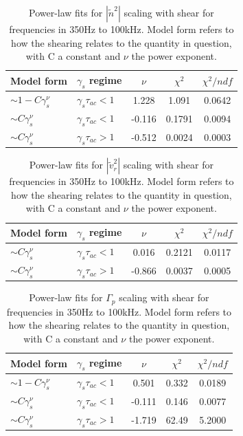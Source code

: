 \documentclass[aip,pop,amsmath,amssymb,reprint,superscriptaddress]{revtex4-1} %
\begin{document}
\begin{table}
\caption{\label{tab:table1}Power-law fits for $|\tilde{n}^{2}|$ scaling with shear for frequencies in 350Hz to 100kHz. Model form refers to how the shearing relates to the quantity in question, with C a constant and $\nu$ the power exponent.}
\begin{ruledtabular}
\begin{tabular}{llccc}
Model form&$\gamma_{s}$ regime&$\nu$&$\chi^2$&$\chi^2/ndf$\\
\hline
$\sim 1-C\gamma_{s}^\nu$&$\gamma_{s}\tau_{ac}<1$&1.228&1.091&0.0642\\
$\sim C\gamma_{s}^\nu$&$\gamma_{s}\tau_{ac}<1$&-0.116&0.1791&0.0094\\
$\sim C\gamma_{s}^\nu$&$\gamma_{s}\tau_{ac}>1$&-0.512&0.0024&0.0003\\
\end{tabular}
\end{ruledtabular}
\end{table}

\begin{table}
\caption{\label{tab:table2}Power-law fits for $|\tilde{v}_{r}^{2}|$ scaling with shear for frequencies in 350Hz to 100kHz. Model form refers to how the shearing relates to the quantity in question, with C a constant and $\nu$ the power exponent.}
\begin{ruledtabular}
\begin{tabular}{llccc}
Model form&$\gamma_{s}$ regime&$\nu$&$\chi^2$&$\chi^2/ndf$\\
\hline
$\sim C\gamma_{s}^\nu$&$\gamma_{s}\tau_{ac}<1$&0.016&0.2121&0.0117\\
$\sim C\gamma_{s}^\nu$&$\gamma_{s}\tau_{ac}>1$&-0.866&0.0037&0.0005\\
\end{tabular}
\end{ruledtabular}
\end{table}

\begin{table}
\caption{\label{tab:table3}Power-law fits for $\Gamma_{p}$ scaling with shear for frequencies in 350Hz to 100kHz. Model form refers to how the shearing relates to the quantity in question, with C a constant and $\nu$ the power exponent.}
\begin{ruledtabular}
\begin{tabular}{llccc}
Model form&$\gamma_{s}$ regime&$\nu$&$\chi^2$&$\chi^2/ndf$\\
\hline
$\sim 1-C\gamma_{s}^\nu$&$\gamma_{s}\tau_{ac}<1$ &0.501   &0.332    &0.0189\\
$\sim C\gamma_{s}^\nu$&$\gamma_{s}\tau_{ac}<1$   &-0.111  &0.146    &0.0077\\
$\sim C\gamma_{s}^\nu$&$\gamma_{s}\tau_{ac}>1$   &-1.719  &62.49    &5.2000\\
\end{tabular}
\end{ruledtabular}
\end{table}
\end{document}

